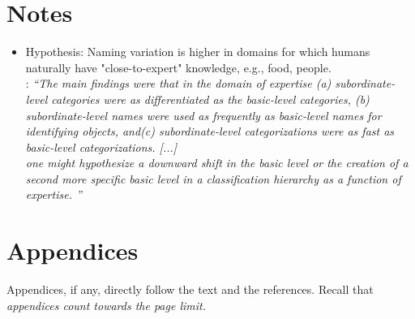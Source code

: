 \documentclass[11pt,a4paper]{article}
\begin{document}
\section{Notes}
\begin{itemize}
	\item Hypothesis: Naming variation is higher in domains for which humans naturally have "close-to-expert" knowledge, e.g., food, people.\\
	: \textit{``The main findings were that in the domain of expertise (a) subordinate-level categories were as differentiated as the basic-level categories, (b) subordinate-level names were used as frequently as basic-level names for identifying objects, and(c) subordinate-level categorizations were as fast as basic-level categorizations. [...]\\
		one might hypothesize a downward shift in the basic level or the creation of a
		second more specific basic level in a classification hierarchy as a function
		of expertise. ''}
\end{itemize}

\section{Appendices} 
\label{sec:appendix}
Appendices, if any, directly follow the text and the
references.  Recall that {\em appendices count
towards the page limit.}




\end{document}
